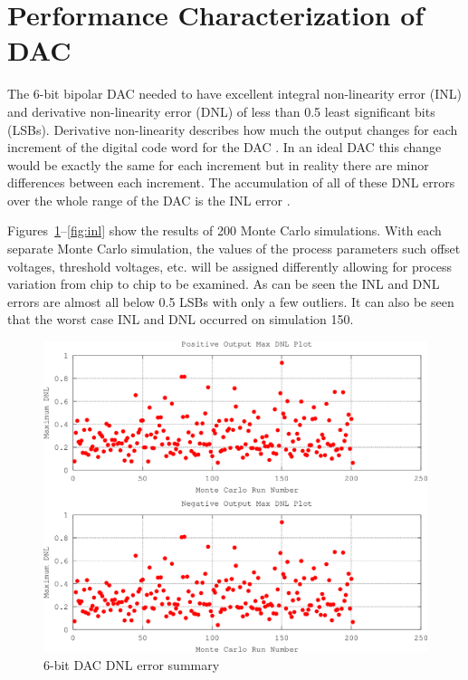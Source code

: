\documentclass[12pt,oneside,final]{siuethesis}
\theoremstyle{definition}
\begin{document}
\section{Performance Characterization of DAC}
\par The 6-bit bipolar DAC needed to have excellent integral non-linearity error (INL) and derivative non-linearity error (DNL) of less than 0.5 least significant bits (LSBs). Derivative non-linearity describes how much the output changes for each increment of the digital code word for the DAC \cite{ALLEN}. In an ideal DAC this change would be exactly the same for each increment but in reality there are minor differences between each increment. The accumulation of all of these DNL errors over the whole range of the DAC is the INL error \cite{ALLEN}. 

\par Figures~\ref{fig:dnl}--\ref{fig:inl} show the results of 200 Monte Carlo simulations. With each separate Monte Carlo simulation, the values of the process parameters such offset voltages, threshold voltages, etc. will be assigned differently allowing for process variation from chip to chip to be examined. As can be seen the INL and DNL errors are almost all below 0.5 LSBs with only a few outliers. It can also be seen that the worst case INL and DNL occurred on simulation 150.

\begin{figure}[htbp!]
 \centering
 \includegraphics[scale=.31]{./ch4_figures/dnl_summary.png}
 \caption{6-bit DAC DNL error summary}
 \label{fig:dnl}
\end{figure} 
\end{document}

